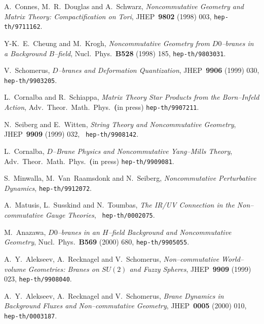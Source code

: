 \documentclass[a4paper,11pt]{article}
\begin{document}
\begin{thebibliography}{99}

\small{
    
  {\small A.~Connes, M.~R.~Douglas and A.~Schwarz, \textit{
Noncommutative Geometry and Matrix Theory: Compactification on Tori}, JHEP\ 
\textbf{9802} (1998) 003, \texttt{hep-th/9711162}. }

  {\small Y-K.~E.~Cheung and M.~Krogh, \textit{
Noncommutative Geometry from $D0$--branes in a Background $B$--field},
Nucl.\ Phys.\ \textbf{B528} (1998) 185, \texttt{hep-th/9803031}. }

  {\small V.~Schomerus, \textit{$D$--branes and
Deformation Quantization}, JHEP\ \textbf{9906} (1999) 030, \texttt{
hep-th/9903205}. }

  {\small L.~Cornalba and R.~Schiappa, \textit{
Matrix Theory Star Products from the Born--Infeld Action}, Adv.\ Theor.\
Math.\ Phys.\ \textbf{(}in press) \texttt{hep-th/9907211}. }

  {\small N.~Seiberg and E.~Witten, \textit{String
Theory and Noncommutative Geometry}, JHEP\ \textbf{9909} (1999) 032, \texttt{
hep-th/9908142}. }

  {\small L.~Cornalba, \textit{$D$--Brane Physics and
Noncommutative Yang--Mills Theory}, Adv.\ Theor.\ Math.\ Phys.\ \textbf{(}in
press) \texttt{hep-th/9909081}. }

  {\small S.~Minwalla, M.~Van~Raamsdonk and N.~Seiberg, \textit{
Noncommutative Perturbative Dynamics}, \texttt{hep-th/9912072}. }

\bibitem{MST}  {\small A.~Matusis, L.~Susskind and N.~Toumbas, \textit{The
IR/UV Connection in the Non--commutative Gauge Theories}, \texttt{
hep-th/0002075}. }

  {\small M.~Anazawa, \textit{$D0$--branes in an
$H$--field Background and Noncommutative Geometry}, Nucl.\ Phys.\
\textbf{B569} (2000) 680, \texttt{hep-th/9905055}. }

\bibitem{ARS-1}  {\small A.~Y.~Alekseev, A.~Recknagel and V.~Schomerus, 
\textit{Non--commutative World--volume Geometries: Branes on $SU(2)$ and
Fuzzy Spheres}, JHEP\ \textbf{9909} (1999) 023, \texttt{hep-th/9908040}. }

\bibitem{ARS-2}  {\small A.~Y.~Alekseev, A.~Recknagel and V.~Schomerus, 
\textit{Brane Dynamics in Background Fluxes and Non--commutative Geometry},
JHEP\ \textbf{0005} (2000) 010, \texttt{hep-th/0003187}. }

}
\end{thebibliography}
\end{document}

